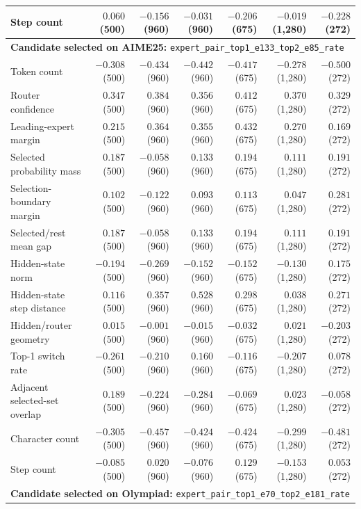 \begin{longtable}{@{}lrrrrrr@{}}
Step count & $0.060$ (500) & $-0.156$ (960) & $-0.031$ (960) & $-0.206$ (675) & $-0.019$ (1,280) & $-0.228$ (272) \\
\midrule
\multicolumn{7}{l}{\textbf{Candidate selected on AIME25:} \texttt{expert\_pair\_top1\_e133\_top2\_e85\_rate}} \\
Token count & $-0.308$ (500) & $-0.434$ (960) & $-0.442$ (960) & $-0.417$ (675) & $-0.278$ (1,280) & $-0.500$ (272) \\
Router confidence & $0.347$ (500) & $0.384$ (960) & $0.356$ (960) & $0.412$ (675) & $0.370$ (1,280) & $0.329$ (272) \\
Leading-expert margin & $0.215$ (500) & $0.364$ (960) & $0.355$ (960) & $0.432$ (675) & $0.270$ (1,280) & $0.169$ (272) \\
Selected probability mass & $0.187$ (500) & $-0.058$ (960) & $0.133$ (960) & $0.194$ (675) & $0.111$ (1,280) & $0.191$ (272) \\
Selection-boundary margin & $0.102$ (500) & $-0.122$ (960) & $0.093$ (960) & $0.113$ (675) & $0.047$ (1,280) & $0.281$ (272) \\
Selected/rest mean gap & $0.187$ (500) & $-0.058$ (960) & $0.133$ (960) & $0.194$ (675) & $0.111$ (1,280) & $0.191$ (272) \\
Hidden-state norm & $-0.194$ (500) & $-0.269$ (960) & $-0.152$ (960) & $-0.152$ (675) & $-0.130$ (1,280) & $0.175$ (272) \\
Hidden-state step distance & $0.116$ (500) & $0.357$ (960) & $0.528$ (960) & $0.298$ (675) & $0.038$ (1,280) & $0.271$ (272) \\
Hidden/router geometry & $0.015$ (500) & $-0.001$ (960) & $-0.015$ (960) & $-0.032$ (675) & $0.021$ (1,280) & $-0.203$ (272) \\
Top-1 switch rate & $-0.261$ (500) & $-0.210$ (960) & $0.160$ (960) & $-0.116$ (675) & $-0.207$ (1,280) & $0.078$ (272) \\
Adjacent selected-set overlap & $0.189$ (500) & $-0.224$ (960) & $-0.284$ (960) & $-0.069$ (675) & $0.023$ (1,280) & $-0.058$ (272) \\
Character count & $-0.305$ (500) & $-0.457$ (960) & $-0.424$ (960) & $-0.424$ (675) & $-0.299$ (1,280) & $-0.481$ (272) \\
Step count & $-0.085$ (500) & $0.020$ (960) & $-0.076$ (960) & $0.129$ (675) & $-0.153$ (1,280) & $0.053$ (272) \\
\midrule
\multicolumn{7}{l}{\textbf{Candidate selected on Olympiad:} \texttt{expert\_pair\_top1\_e70\_top2\_e181\_rate}} \\

\end{longtable}
